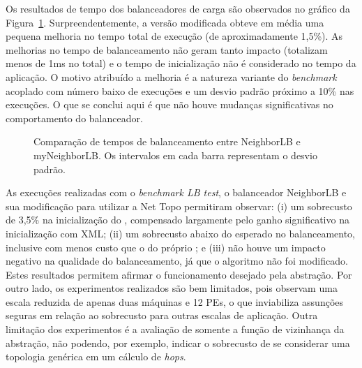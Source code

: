 Os resultados de tempo dos balanceadores de carga são observados no gráfico da Figura~\ref{fig:exec_times}. Surpreendentemente, a versão modificada obteve em média uma pequena melhoria no tempo total de execução (de aproximadamente 1,5\%). 
As melhorias no tempo de balanceamento não geram tanto impacto (totalizam menos de 1ms no total) e o tempo de inicialização não é considerado no tempo da aplicação.
O motivo atribuído a melhoria é a natureza variante do \textit{benchmark} acoplado com número baixo de execuções e um desvio padrão próximo a 10\% nas execuções.
O que se conclui aqui é que não houve mudanças significativas no comportamento do balanceador.
\begin{figure}[h]
    \centering
    \caption[Comparação de tempos de balanceamento entre NeighborLB e myNeighborLB.] {Comparação de tempos de balanceamento entre NeighborLB e myNeighborLB. Os intervalos em cada barra representam o desvio padrão.}
    \label{fig:exec_times}
\end{figure}

As execuções realizadas com o \textit{benchmark LB test}, o balanceador NeighborLB e sua modificação para utilizar a Net Topo permitiram observar: (i) um sobrecusto de 3,5\% na inicialização do \charm, compensado largamente pelo ganho significativo na inicialização com XML; (ii) um sobrecusto abaixo do esperado no balanceamento, inclusive com menos custo que o do próprio \charm; e (iii) não houve um impacto negativo na qualidade do balanceamento, já que o algoritmo não foi modificado.
Estes resultados permitem afirmar o funcionamento desejado pela abstração.
Por outro lado, os experimentos realizados são bem limitados, pois observam uma escala reduzida de apenas duas máquinas e 12 PEs, o que inviabiliza assunções seguras em relação ao sobrecusto para outras escalas de aplicação.
Outra limitação dos experimentos é a avaliação de somente a função de vizinhança da abstração, não podendo, por exemplo, indicar o sobrecusto de se considerar uma topologia genérica em um cálculo de \textit{hops}.


